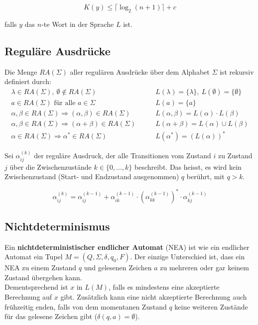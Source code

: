 \documentclass[11pt]{article}
\begin{document}
\begin{equation*}
	K(y) \leq \lceil\log_2(n+1)\rceil + c
\end{equation*}

falls $y$ das $n$-te Wort in der Sprache $L$ ist.

\subsection{Regul{\"a}re Ausdr{\"u}cke}

Die Menge $RA(\Sigma)$ aller regul{\"a}ren Ausdr{\"u}cke {\"u}ber dem Alphabet $\Sigma$ ist rekursiv definiert durch:
\begin{equation*}
\begin{split}
	\lambda \in RA(\Sigma),\ \emptyset \not\in RA(\Sigma) \qquad & L(\lambda) = \{\lambda\},\ L(\emptyset) = \{\emptyset\} \\
	a \in RA(\Sigma) \text{ f{\"u}r alle } a \in \Sigma \qquad & L(a) = \{a\} \\
	\alpha, \beta \in RA(\Sigma) \Rightarrow (\alpha, \beta) \in RA(\Sigma) \qquad & L(\alpha, \beta) = L(\alpha) \cdot L(\beta) \\
	\alpha, \beta \in RA(\Sigma) \Rightarrow (\alpha + \beta) \in RA(\Sigma) \qquad & L(\alpha + \beta) = L(\alpha) \cup L(\beta) \\
	\alpha \in RA(\Sigma) \Rightarrow \alpha^* \in RA(\Sigma) \qquad & L(\alpha^*) = (L(\alpha))^*
\end{split}
\end{equation*}

Sei $\alpha_{ij}^{(k)}$ der regul{\"a}re Ausdruck, der alle Transitionen vom Zustand $i$ zu Zustand $j$ {\"u}ber die Zwischenzust{\"a}nde $k \in \{0,...,k\}$ beschreibt. Das heisst, es wird kein Zwischenzustand (Start- und Endzustand ausgenommen) $q$ ber{\"u}hrt, mit $q > k$.

\begin{equation*}
	\alpha_{ij}^{(k)} = \alpha_{ij}^{(k-1)} + \alpha_{ik}^{(k-1)}\cdot (\alpha_{kk}^{(k-1)})^* \cdot \alpha_{kj}^{(k-1)}
\end{equation*}
	
\subsection{Nichtdeterminismus}	

Ein \textbf{nichtdeterministischer endlicher Automat} (NEA) ist wie ein endlicher Automat ein Tupel $M = (Q, \Sigma, \delta, q_0, F)$. Der einzige Unterschied ist, dass ein NEA zu einem Zustand $q$ und gelesenen Zeichen $a$ zu mehreren oder gar keinem Zustand {\"u}bergehen kann. \\
Dementsprechend ist $x$ in $L(M)$, falls es mindestens eine akzeptierte Berechnung auf $x$ gibt. Zus{\"a}tzlich kann eine nicht akzeptierte Berechnung auch fr{\"u}hzeitig enden, falls von dem momentanen Zustand $q$ keine weiteren Zust{\"a}nde f{\"u}r das gelesene Zeichen gibt ($\delta(q, a) = \emptyset$).
\end{document}
